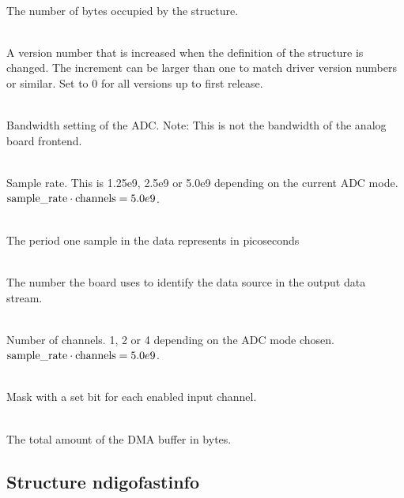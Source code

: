 			\\
			The number of bytes occupied by the structure.\par

			\\
			A version number that is increased when the definition of the structure is changed. The increment can be larger than one to match driver version numbers or similar. Set to 0 for all versions up to
first release.\par

			\\
			Bandwidth setting of the ADC. Note: This is not the bandwidth of the analog board frontend. \par

			\\
			Sample rate. This is 1.25e9, 2.5e9 or 5.0e9 depending on the current ADC mode. $\text{sample\textunderscore rate}\cdot \text{channels} = 5.0e9$.\par
			
			\\
			The period one sample in the data represents in picoseconds\par

			\\
			The number the board uses to identify the data source in the output data stream.\par

			\\
			Number of channels. 1, 2 or 4 depending on the ADC mode chosen. $\text{sample\textunderscore rate}\cdot\text{channels} = 5.0e9$.\par

			\\
			Mask with a set bit for each enabled input channel.\par

			\\
			The total amount of the DMA buffer in bytes.\par

		
		\subsection{Structure ndigo\tu fast\tu info}
		
